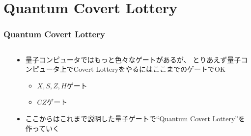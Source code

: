 \section{Quantum Covert Lottery}

\begin{frame}
  \frametitle{Quantum Covert Lottery}

  \begin{columns}
    \begin{column}{0.55\textwidth}
      \begin{minipage}[t][.6\textheight][t]{\textwidth}
        \tableofcontents[currentsection]
      \end{minipage}
    \end{column}
    \begin{column}{0.45\textwidth}
      \begin{itemize}
        \item 量子コンピュータではもっと色々なゲートがあるが、
        とりあえず量子コンピュータ上でCovert LotteryをやるにはここまでのゲートでOK
        \begin{itemize}
          \item $X, S, Z, H$ゲート
          \item $CZ$ゲート
        \end{itemize}
        
        \item ここからはこれまで説明した量子ゲートで``Quantum Covert Lottery''を作っていく
      \end{itemize}
    \end{column}
  \end{columns}
\end{frame}



